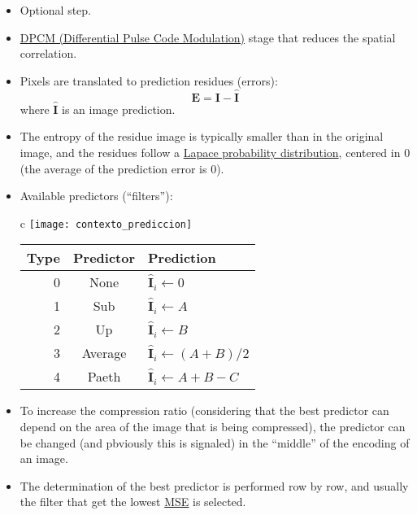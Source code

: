 \begin{itemize}
\item Optional step.
\item
  \href{https://en.wikipedia.org/wiki/Differential_pulse-code_modulation}{DPCM
    (Differential Pulse Code Modulation)} stage that reduces the
  spatial correlation.
\item Pixels are translated to prediction residues (errors):
  \begin{equation*}
    {\mathbf E} = {\mathbf I} - \hat{\mathbf I}
  \end{equation*}
  where $\hat{\mathbf I}$ is an image prediction.
\item The entropy of the residue image is typically smaller than in
  the original image, and the residues follow a
  \href{https://en.wikipedia.org/wiki/Laplace_distribution}{Lapace
    probability distribution}, centered in 0 (the average of the
  prediction error is 0).
\item Available predictors (``filters''):
  \begin{center}
    \begin{tabular}{c}
      \texttt{[image: contexto\_prediccion]} \\
      \begin{tabular}{rcl}
        Type & Predictor & Prediction \\
        \hline
        0 &	None 	& $\hat{\mathbf I}_i\leftarrow 0$ \\
        1 &	Sub 	& $\hat{\mathbf I}_i\leftarrow A$ \\
        2 &	Up 	& $\hat{\mathbf I}_i\leftarrow B$ \\
        3 &	Average & $\hat{\mathbf I}_i\leftarrow (A+B)/2$ \\
        4 &	Paeth 	& $\hat{\mathbf I}_i\leftarrow A + B - C$
      \end{tabular}
    \end{tabular}
  \end{center}
\item To increase the compression ratio (considering that the best
  predictor can depend on the area of the image that is being
  compressed), the predictor can be changed (and pbviously this is
  signaled) in the ``middle'' of the encoding of an image.
\item The determination of the best predictor is performed row by row,
  and usually the filter that get the lowest
  \href{https://en.wikipedia.org/wiki/Mean_squared_error}{MSE} is
  selected.
\end{itemize}

